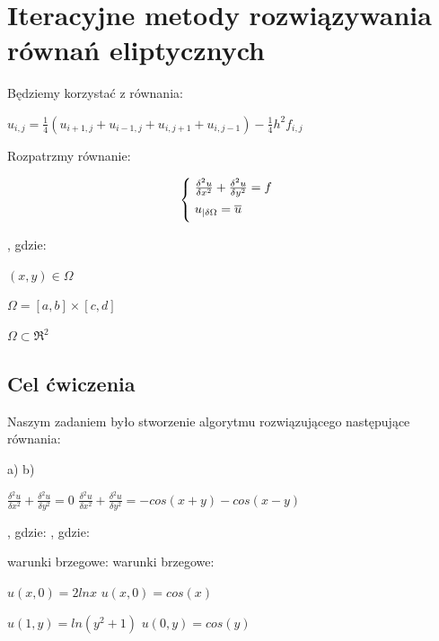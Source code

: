 \section{Iteracyjne metody rozwiązywania równań eliptycznych}

Będziemy korzystać z równania:

$u_{i,j} = \frac{1}{4}(u_{i+1,j} + u_{i-1,j} + u_{i,j+1} + u_{i,j-1}) - \frac{1}{4}h^2f_{i,j}$

\vspace{0.5cm}

Rozpatrzmy równanie:

\[
\begin{cases}
\vspace{0.1cm} 
\hspace{0,1cm}\frac{\delta^2 u}{\delta x^2} + \frac{\delta^2 u}{\delta y^2} = f\\
\vspace{0.1cm}
\hspace{0,1cm}u_{|\delta \Omega} = \overline{u} \\
\end{cases}
\]

, gdzie:

$(x,y) \in \Omega$

$\Omega = [a,b] \times [c,d]$

$\Omega \subset \Re^2$

\subsection{Cel ćwiczenia}

Naszym zadaniem było stworzenie algorytmu rozwiązującego następujące równania:

a) \hspace{6cm} b)

$\frac{\delta^2 u}{\delta x^2} + \frac{\delta^2 u}{\delta y^2} = 0$ \hspace{4.15cm} $\frac{\delta^2 u}{\delta x^2} + \frac{\delta^2 u}{\delta y^2} = -cos(x+y)-cos(x-y)$

, gdzie: \hspace{5.2cm} , gdzie:

warunki brzegowe: \hspace{3.5cm} warunki brzegowe:

$u(x,0) = 2lnx$ \hspace{4.15cm} $u(x,0) = cos(x)$

$u(1,y) = ln(y^2 + 1)$ \hspace{3.3cm} $u(0,y) = cos(y)$

